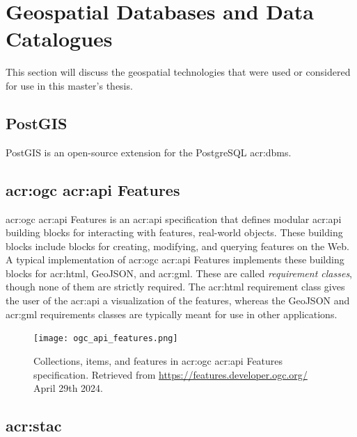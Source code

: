 \section{Geospatial Databases and Data Catalogues}
\label{sec:geo-dbs-and-data-catalogues}

This section will discuss the geospatial technologies that were used or considered for use in this master's thesis.

\subsection{PostGIS}

PostGIS \citep{PostGIS2001} is an open-source extension for the PostgreSQL \acrshort{acr:dbms}.

\subsection[OGC API Features]{\acrshort{acr:ogc} \acrshort{acr:api} Features}

\acrshort{acr:ogc} \acrshort{acr:api} Features \citep{opengeospatialconsortiumOGCAPIFeatures2022} is an \acrshort{acr:api} specification that defines modular \acrshort{acr:api} building blocks for interacting with features, real-world objects. These building blocks include blocks for creating, modifying, and querying features on the Web. A typical implementation of \acrshort{acr:ogc} \acrshort{acr:api} Features implements these building blocks for \acrshort{acr:html}, GeoJSON, and \acrshort{acr:gml}. These are called \textit{requirement classes}, though none of them are strictly required. The \acrshort{acr:html} requirement class gives the user of the \acrshort{acr:api} a visualization of the features, whereas the GeoJSON and \acrshort{acr:gml} requirements classes are typically meant for use in other applications.

\begin{figure}[h]
    \centering
    \texttt{[image: ogc\_api\_features.png]}
    \caption{Collections, items, and features in \acrshort{acr:ogc} \acrshort{acr:api} Features specification. Retrieved from \url{https://features.developer.ogc.org/} April 29th 2024.}
    \label{fig:oaf-collections-items-features}
\end{figure}

\subsection[SpatioTemporal Asset Catalogs]{\acrlong{acr:stac}}










\glsresetall

